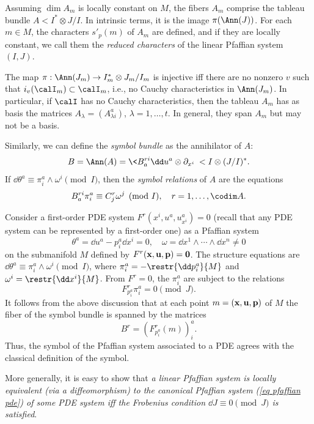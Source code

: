 \begin{defn}
    Assuming $\dim A_m$ is locally constant on $M$, the fibers $A_m$ comprise the tableau bundle $A<I^\ast\otimes J\slash I$. In intrinsic terms, it is the image $\pi(\Ann(J))$. For each $m\in M$, the characters $s'_p(m)$ of $A_m$ are defined, and if they are locally constant, we call them the \emph{reduced characters} of the linear Pfaffian system $(I,J)$.
\end{defn}

\begin{rem}
    The map $\pi:\Ann(J_m)\to I_m^\ast\otimes J_m\slash I_m$ is injective iff there are no nonzero $v$ such that $i_v(\calI_m)\subset \calI_m$, i.e., no Cauchy characteristics in $\Ann(J_m)$. In particular, if $\calI$ has no Cauchy characteristics, then the tableau $A_m$ has as basis the matrices $A_\lambda=(A^a_{\lambda i})$, $\lambda=1,\ldots,t$. In general, they span $A_m$ but may not be a basis.
\end{rem}

Similarly, we can define the \emph{symbol bundle} as the annihilator of $A$: 
\[B=\Ann(A)=\<B^{ri}_a \dd u^a\otimes \partial_{x^i}\>< I\otimes (J\slash I)^\ast.\] 
If $\dd\theta^a\equiv \pi^a_i\wedge \omega^i\pmod{I}$, then the \emph{symbol relations} of $A$ are the equations
\[B^{ri}_a\pi^a_i\equiv C^r_j \omega^j\pmod{I},\quad r=1,\ldots,\codim A.\]


\begin{example}[PDEs]
    Consider a first-order PDE system $F^r(x^i,u^a,u^a_{x^i})=0$ (recall that any PDE system can be represented by a first-order one) as a Pfaffian system 
    \[\theta^a=\dd u^a-p^a_i\dd x^i=0,\quad \omega=\dd x^1\wedge\cdots\wedge\dd x^n\neq 0\label{eq pfaffian pde}\]
    on the submanifold $M$ defined by $F^r(\bf{x},\bf{u},\bf{p})=0$. The structure equations are $\dd \theta^a\equiv \pi^a_i\wedge\omega^i\pmod{I}$, where $\pi^a_i=-\restr{\dd p^a_i}{M}$ and $\omega^i=\restr{\dd x^i}{M}$. From $F^r=0$, the $\pi^a_i$ are subject to the relations 
    \[F^r_{p^a_i}\pi^a_i=0\pmod{J}.\]
    It follows from the above discussion that at each point $m=(\bf{x},\bf{u},\bf{p})$ of $M$ the fiber of the symbol bundle is spanned by the matrices 
    \[B^r=\left(F^r_{p^a_i}(m)\right)_i^a.\]
    Thus, the symbol of the Pfaffian system associated to a PDE agrees with the classical definition of the symbol.

    More generally, it is easy to show that \emph{a linear Pfaffian system is locally equivalent (via a diffeomorphism) to the canonical Pfaffian system (\ref{eq pfaffian pde}) of some PDE system iff the Frobenius condition $\dd J\equiv 0\pmod{J}$ is satisfied}.
\end{example}

